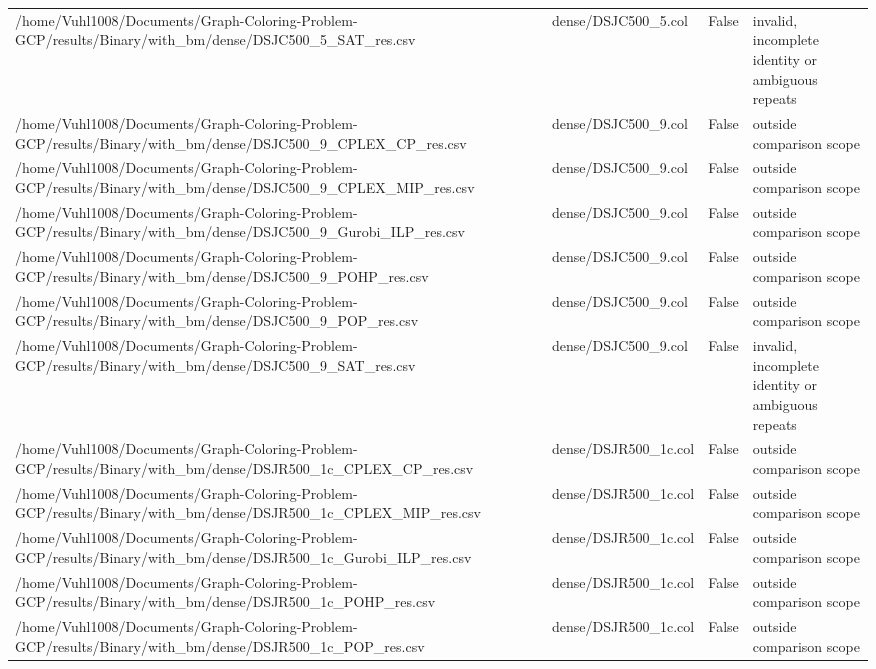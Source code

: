 \begin{table}[htbp]
\begin{tabular}{llll}
/home/Vuhl1008/Documents/Graph-Coloring-Problem-GCP/results/Binary/with\_bm/dense/DSJC500\_5\_SAT\_res.csv & dense/DSJC500\_5.col & False & invalid, incomplete identity or ambiguous repeats \\
/home/Vuhl1008/Documents/Graph-Coloring-Problem-GCP/results/Binary/with\_bm/dense/DSJC500\_9\_CPLEX\_CP\_res.csv & dense/DSJC500\_9.col & False & outside comparison scope \\
/home/Vuhl1008/Documents/Graph-Coloring-Problem-GCP/results/Binary/with\_bm/dense/DSJC500\_9\_CPLEX\_MIP\_res.csv & dense/DSJC500\_9.col & False & outside comparison scope \\
/home/Vuhl1008/Documents/Graph-Coloring-Problem-GCP/results/Binary/with\_bm/dense/DSJC500\_9\_Gurobi\_ILP\_res.csv & dense/DSJC500\_9.col & False & outside comparison scope \\
/home/Vuhl1008/Documents/Graph-Coloring-Problem-GCP/results/Binary/with\_bm/dense/DSJC500\_9\_POHP\_res.csv & dense/DSJC500\_9.col & False & outside comparison scope \\
/home/Vuhl1008/Documents/Graph-Coloring-Problem-GCP/results/Binary/with\_bm/dense/DSJC500\_9\_POP\_res.csv & dense/DSJC500\_9.col & False & outside comparison scope \\
/home/Vuhl1008/Documents/Graph-Coloring-Problem-GCP/results/Binary/with\_bm/dense/DSJC500\_9\_SAT\_res.csv & dense/DSJC500\_9.col & False & invalid, incomplete identity or ambiguous repeats \\
/home/Vuhl1008/Documents/Graph-Coloring-Problem-GCP/results/Binary/with\_bm/dense/DSJR500\_1c\_CPLEX\_CP\_res.csv & dense/DSJR500\_1c.col & False & outside comparison scope \\
/home/Vuhl1008/Documents/Graph-Coloring-Problem-GCP/results/Binary/with\_bm/dense/DSJR500\_1c\_CPLEX\_MIP\_res.csv & dense/DSJR500\_1c.col & False & outside comparison scope \\
/home/Vuhl1008/Documents/Graph-Coloring-Problem-GCP/results/Binary/with\_bm/dense/DSJR500\_1c\_Gurobi\_ILP\_res.csv & dense/DSJR500\_1c.col & False & outside comparison scope \\
/home/Vuhl1008/Documents/Graph-Coloring-Problem-GCP/results/Binary/with\_bm/dense/DSJR500\_1c\_POHP\_res.csv & dense/DSJR500\_1c.col & False & outside comparison scope \\
/home/Vuhl1008/Documents/Graph-Coloring-Problem-GCP/results/Binary/with\_bm/dense/DSJR500\_1c\_POP\_res.csv & dense/DSJR500\_1c.col & False & outside comparison scope \\

\end{tabular}
\end{table}
